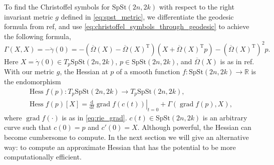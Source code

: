To find the Christoffel symbols for $\mathrm{SpSt}(2n, 2k)$ with respect to the right invariant metric $g$ defined in \eqref{eq:spst_metric}, we differentiate the geodesic formula from ref, and use \eqref{eq:christoffel_symbols_through_geodesic} to achieve the following formula,
\begin{equation*}
    \Gamma(X,X)=-\ddot{\gamma}(0)=-(\overline{\Omega}(X)-\overline{\Omega}(X)^{\mathrm{T}})(X+\overline{\Omega}(X)^{\mathrm{T}}p)-(\overline{\Omega}(X)^{\mathrm{T}})^{2}p.
\end{equation*}
Here $X=\dot{\gamma}(0)\in T_{p}\mathrm{SpSt}(2n, 2k)$, $p\in \mathrm{SpSt}(2n, 2k)$, and $\overline{\Omega}(X)$ is as in ref. 
With our metric $g$, the Hessian at $p$ of a smooth function $f\colon \mathrm{SpSt}(2n, 2k)\xrightarrow{}\mathbb{R}$ is the endomorphism 
\begin{equation}\label{eq:riemannian_hessian}
    \begin{gathered}
        \operatorname{Hess}f(p)\colon T_{p}\mathrm{SpSt}(2n, 2k)\xrightarrow{}T_{p}\mathrm{SpSt}(2n, 2k),  \\
        \operatorname{Hess}f(p)[X]=\left.\frac{\mathrm{d}}{\mathrm{d}t}\operatorname{grad}f(c(t))\right|_{t=0}+\Gamma(\operatorname{grad}f(p),X),
    \end{gathered}
\end{equation}
where $\operatorname{grad}f(\cdot)$ is as in \ref{eq:rie_grad}. $c(t)\in \mathrm{SpSt}(2n, 2k)$ is an arbitrary curve such that $c(0)=p$ and $c'(0)=X$. 
Although powerful, the Hessian can become cumbersome to compute. In the next section we will give an alternative way: to compute an approximate Hessian that has the potential to be more computationally efficient. 